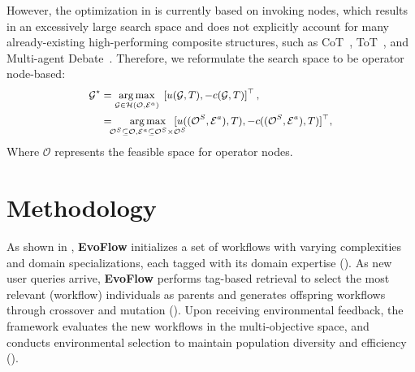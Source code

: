 \documentclass{article}
\theoremstyle{plain}
\theoremstyle{definition}
\theoremstyle{remark}
\newcommand{\ourmethod}{{\fontfamily{lmtt}\selectfont \textbf{EvoFlow}}\xspace}
\begin{document}
However, the optimization in  is currently based on invoking nodes, which results in an excessively large search space and does not explicitly account for many already-existing high-performing composite structures, such as CoT~\citep{cot}, ToT~\cite{tot}, and Multi-agent Debate~\cite{arXiv2023_MultiAgent-Debate}. Therefore, we reformulate the search space to be operator node-based:
\begin{equation}
\small
\begin{aligned}
\mathcal{G}^\star & = \underset{\mathcal{G} \in \mathcal{H}(\mathcal{O}, \mathcal{E}^a)}{\arg\max} \; \left[ u(\mathcal{G}, T), -c(\mathcal{G}, T) \right]^\top,\\
& = \!\!\!\underset{\mathcal{O}^S\subseteq\mathcal{O}, \mathcal{E}^a\subseteq\mathcal{O}^S\times \mathcal{O}^S }{\arg\max}{\!\!\!\!\!\!\! [u((\mathcal{O}^S,\mathcal{E}^a), T), -c((\mathcal{O}^S,\mathcal{E}^a), T)]^\top},
\end{aligned}
\end{equation}
Where \(\mathcal{O}\) represents the feasible space for operator nodes.











\vspace{-0.4em}
\section{Methodology}
\vspace{-0.5em}


As shown in , \ourmethod initializes a set of workflows with varying complexities and domain specializations, each tagged with its domain expertise (). As new user queries arrive, \ourmethod performs tag-based retrieval to select the most relevant (workflow) individuals as parents and generates offspring workflows through crossover and mutation (). Upon receiving environmental feedback, the framework evaluates the new workflows in the multi-objective space, and conducts environmental selection to maintain population diversity and efficiency ().
    
\vspace{-0.5em}
\end{document}
